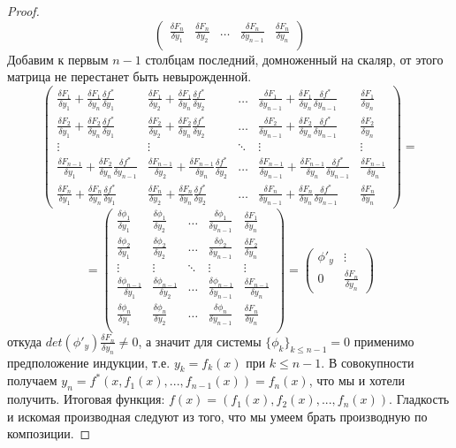 \documentclass{article}
\theoremstyle{indented}
\theoremstyle{definition}
\theoremstyle{remark}
\newcommand{\df}[2]{\frac{\delta #1}{\delta #2}}
\begin{document}
\begin{proof}
$$\begin{pmatrix}
        \df{F_n}{y_1} & \df{F_n}{y_2} &\ldots & \df{F_n}{y_{n-1}} & \df{F_n}{y_n}\\
    \end{pmatrix}    
    $$
    Добавим к первым $n-1$ столбцам последний, домноженный на скаляр, от этого матрица не перестанет быть невырожденной.
    $$
    \begin{pmatrix}
        \df{F_1}{y_1} + \df{F_1}{y_n} \df{f^*}{y_1} & \df{F_1}{y_2} + \df{F_1}{y_n} \df{f^*}{y_2} &\ldots & \df{F_1}{y_{n-1}} + \df{F_1}{y_n} \df{f^*}{y_{n-1}} & \df{F_1}{y_n}\\
        \df{F_2}{y_1} + \df{F_2}{y_n} \df{f^*}{y_1} & \df{F_2}{y_2} + \df{F_2}{y_n} \df{f^*}{y_2} &\ldots & \df{F_2}{y_{n-1}} + \df{F_2}{y_n} \df{f^*}{y_{n-1}} & \df{F_2}{y_n}\\
        \vdots                                      & \vdots                                      &\ddots & \vdots                                              & \vdots      \\
        \df{F_{n-1}}{y_1} + \df{F_2}{y_n} \df{f^*}{y_{n-1}}& \df{F_{n-1}}{y_2} + \df{F_{n-1}}{y_n} \df{f^*}{y_2} &\ldots & \df{F_{n-1}}{y_{n-1}}  + \df{F_{n-1}}{y_n} \df{f^*}{y_{n-1}} & \df{F_{n-1}}{y_n}\\
        \df{F_n}{y_1} + \df{F_n}{y_n} \df{f^*}{y_1} & \df{F_n}{y_2} + \df{F_n}{y_n} \df{f^*}{y_2} &\ldots & \df{F_n}{y_{n-1}} + \df{F_n}{y_n} \df{f^*}{y_{n-1}} & \df{F_n}{y_n}
    \end{pmatrix}  = 
    $$
    $$
    =
    \begin{pmatrix}
        \df{\phi_1}{y_1} & \df{\phi_1}{y_2} &\ldots & \df{\phi_1}{y_{n-1}} & \df{F_1}{y_n}\\
        \df{\phi_2}{y_1} & \df{\phi_2}{y_2} &\ldots & \df{\phi_2}{y_{n-1}} & \df{F_2}{y_n}\\
        \vdots           & \vdots           &\ddots & \vdots               &  \vdots \\
        \df{\phi_{n-1}}{y_1} & \df{\phi_{n-1}}{y_2} &\ldots & \df{\phi_{n-1}}{y_{n-1}} & \df{F_{n-1}}{y_n}\\
        \df{\phi_n}{y_1} & \df{\phi_n}{y_2} &\ldots & \df{\phi_n}{y_{n-1}} & \df{F_n}{y_n}\\
    \end{pmatrix} 
    =
    \begin{pmatrix}
        \phi'_y & \vdots \\
        0 & \df{F_n}{y_n}
    \end{pmatrix}
    $$
    откуда $det(\phi'_y) \df{F_n}{y_n} \not= 0$, а значит для системы $\{\phi_k\}_{k\leq n-1}=0$ применимо предположение индукции, т.е. $y_k = f_k(x)$ при $k \leq n-1$.
    В совокупности получаем $y_n=f^*(x, f_1(x), ... , f_{n-1}(x))=f_n(x)$, что мы и хотели получить. Итоговая функция: $f(x)=(f_1(x), f_2(x), ... , f_n(x))$. Гладкость и искомая производная следуют из того, что мы умеем брать
    производную по композиции.  
\end{proof}
\end{document}
